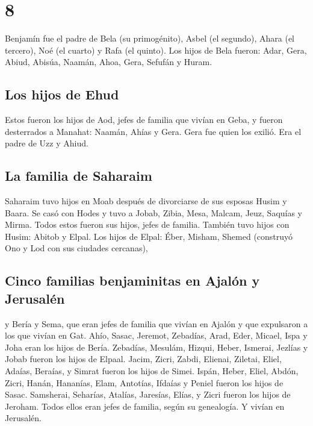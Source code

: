 \hypertarget{section-7}{%
\section{8}\label{section-7}}

 Benjamín fue el padre de Bela (su primogénito), Asbel (el
segundo), Ahara (el tercero),  Noé (el cuarto) y Rafa (el
quinto).  Los hijos de Bela fueron: Adar, Gera, Abiud,
 Abisúa, Naamán, Ahoa,  Gera, Sefufán y
Huram.

\hypertarget{los-hijos-de-ehud}{%
\subsection{Los hijos de Ehud}\label{los-hijos-de-ehud}}

 Estos fueron los hijos de Aod, jefes de familia que
vivían en Geba, y fueron desterrados a Manahat:  Naamán,
Ahías y Gera. Gera fue quien los exilió. Era el padre de Uzz y Ahiud.

\hypertarget{la-familia-de-saharaim}{%
\subsection{La familia de Saharaim}\label{la-familia-de-saharaim}}

 Saharaim tuvo hijos en Moab después de divorciarse de sus
esposas Husim y Baara.  Se casó con Hodes y tuvo a Jobab,
Zibia, Mesa, Malcam,  Jeuz, Saquías y Mirma. Todos estos
fueron sus hijos, jefes de familia.  También tuvo hijos
con Husim: Abitob y Elpal.  Los hijos de Elpal: Éber,
Misham, Shemed (construyó Ono y Lod con sus ciudades cercanas),

\hypertarget{cinco-familias-benjaminitas-en-ajaluxf3n-y-jerusaluxe9n}{%
\subsection{Cinco familias benjaminitas en Ajalón y
Jerusalén}\label{cinco-familias-benjaminitas-en-ajaluxf3n-y-jerusaluxe9n}}

 y Bería y Sema, que eran jefes de familia que vivían en
Ajalón y que expulsaron a los que vivían en Gat.  Ahío,
Sasac, Jeremot,  Zebadías, Arad, Eder, 
Micael, Ispa y Joha eran los hijos de Bería.  Zebadías,
Mesulám, Hizqui, Heber,  Ismerai, Jezlías y Jobab fueron
los hijos de Elpaal.  Jacim, Zicri, Zabdi,
 Elienai, Ziletai, Eliel,  Adaías,
Beraías, y Simrat fueron los hijos de Simei.  Ispán,
Heber, Eliel,  Abdón, Zicri, Hanán, 
Hananías, Elam, Antotías,  Ifdaías y Peniel fueron los
hijos de Sasac.  Samsherai, Seharías, Atalías,
 Jaresías, Elías, y Zicri fueron los hijos de Jeroham.
 Todos ellos eran jefes de familia, según su genealogía.
Y vivían en Jerusalén.


